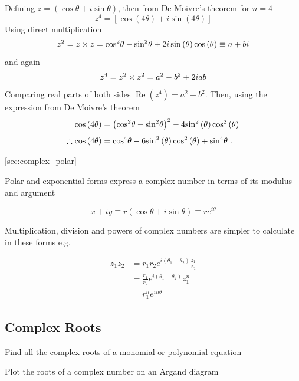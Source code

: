\begin{solution}
Defining $z=\left(\cos \theta +i\sin \theta \right)$, then from De Moivre’s theorem for $n=4$
\[
{z}^{4}=\left[\cos \left(4\theta \right)+i\sin \left(4\theta \right)\right]
\]
Using direct multiplication
\[
{z}^{2}=z\times z={\cos }^{2} \theta -{\sin }^{2} \theta +2i\sin \left(\theta \right)\cos \left(\theta \right) \equiv a+bi
\]
and again
\[
{z}^{4}={z}^{2}\times {z}^{2}={a}^{2}-{b}^{2}+2iab
\]
Comparing real parts of both sides $\operatorname{Re}\left({z}^{4}\right)={a}^{2}-{b}^{2}$. Then, using the expression from De Moivre’s theorem
\begin{align*}
\cos \left(4\theta \right) &={\left({\cos }^{2} \theta -{\sin }^{2} \theta \right)}^{2}-4{\sin }^{2} \left(\theta \right){\cos }^{2} \left(\theta \right)
\\[4pt]
\therefore \cos \left(4\theta \right) &={\cos }^{4} \theta -6{\sin }^{2} \left(\theta \right){\cos }^{2} \left(\theta \right)+{\sin }^{4} \theta \; .
\end{align*}
\end{solution}


\goodbreak
\begin{recap}{\ref{sec:complex_polar}}

\item Polar and exponential forms express a complex number in terms of its modulus and argument

\[
x+iy\equiv r\left(\cos \theta +i\sin \theta \right)\equiv r{e}^{i\theta }
\]

\item Multiplication, division and powers of complex numbers are simpler to calculate in these forms e.g.

\[
\begin{aligned}
{z}_{1}{z}_{2}&={r}_{1}{r}_{2}{e}^{i\left({\theta }_{1}+{\theta }_{2}\right)} \frac{{z}_{1}}{{z}_{2}}\\
&=\frac{{r}_{1}}{{r}_{2}}{e}^{i\left({\theta }_{1}-{\theta }_{2}\right)} {z}_{1}^{n}\\
&={r}_{1}^{n}{e}^{in{\theta }_{1}}
\end{aligned}
\]
\end{recap}

\newtexpage
\subsection{Complex Roots}
\label{sec:complex_roots}

\begin{learningoutcomes}
\item Find all the complex roots of a monomial or polynomial equation
\item Plot the roots of a complex number on an Argand diagram
\end{learningoutcomes}

